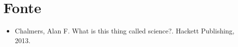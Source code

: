 \documentclass{article}
\begin{document}
\section*{Fonte}

\begin{itemize}
    \item Chalmers, Alan F. What is this thing called science?. Hackett Publishing, 2013.
\end{itemize}

%
%
\end{document}
